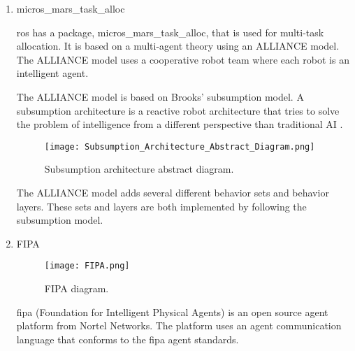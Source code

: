 
\begin{enumerate}
    \item micros\_mars\_task\_alloc

    \acs{ros} has a package, micros\_mars\_task\_alloc, that is used for multi-task allocation. It is based on
    a multi-agent theory using an ALLIANCE model. The ALLIANCE model uses a cooperative robot team where
    each robot is an intelligent agent.
    
    The ALLIANCE model is based on Brooks' subsumption model. A subsumption architecture is a reactive robot architecture that tries to solve 
    the problem of intelligence from a different perspective than traditional AI \cite{ros:micros_mars_task_alloc}. 
    
    \begin{figure}[ht]
        \centering
        \texttt{[image: Subsumption\_Architecture\_Abstract\_Diagram.png]}
        \caption[Subsumption architecture abstract diagram]{Subsumption architecture abstract diagram\footnotemark.}
    \end{figure}
    
    The ALLIANCE model adds several different behavior sets and behavior layers. These sets and layers are both implemented by following 
    the subsumption model.

    \newpage
    \item FIPA 

    \begin{figure}[ht]
        \centering
        \texttt{[image: FIPA.png]}
        \caption[FIPA]{FIPA diagram\footnotemark.}
    \end{figure}

    \acs{fipa} (Foundation for Intelligent Physical Agents) is an open source agent platform from Nortel Networks. The platform uses an 
    agent communication language that conforms to the \acs{fipa} agent standards. \cite{FIPA-OS}

\end{enumerate}